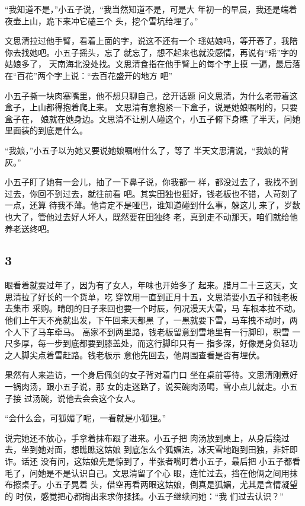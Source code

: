 “我知道不是，”小五子说，“我当然知道不是，可是大
年初一的早晨，我还是端着夜壶上山，跪下来冲它磕三个
头，挖个雪坑给埋了。”

文思清拉过他手臂，看着上面的字，说这不还有一个
瑶姑娘吗，等开春了，我陪你去找她吧。小五子摇头，忘了
就忘了，想不起来也就没感情，再说有“瑶”字的姑娘多了，
天南海北没处找。文思清食指在他手臂上的每个字上摸
一遍，最后落在“百花”两个字上说：“去百花盛开的地方
吧”

小五子撕一块肉塞嘴里，他不想只聊自己，岔开话题
问文思清，为什么老带着这盒子，上山都得抱着爬上来。
文思清有意抱紧一下盒子，说是她娘嘱咐的，只要盒子在，
娘就在她身边。文思清不让别人碰这个，小五子俯下身瞧
了半天，问她里面装的到底是什么。

“我娘，”小五子以为她又要说她娘嘱咐什么了，等了
半天文思清说，“我娘的背灰。”

小五子盯了她有一会儿，抽了一下鼻子说，你我都一
样，都没过去了，我找不到过去，你回不到过去，就往前看
吧。其实田独也挺好，钱老板也不错，人苛刻了一点，还算
待我不薄。他肯定不是哑巴，谁知道碰到什么事，躲这儿
来了，岁数也大了，管他过去好人坏人，既然要在田独终
老，真到走不动那天，咱们就给他养老送终吧。
\newline

{\centering\subsection{3}}

眼看着就要过年了，因为有了女人，年味也开始多了
起来。腊月二十三这天，文思清拉了好长的一个货单，吃
穿饮用一直到正月十五，文思清要小五子和钱老板去集市
采购。晴朗的日子来回也要一个时辰，何况漫天大雪，马
车根本拉不动。他们上午天不亮就出发，下午回来天都黑
了，一黑就要下雪，马车拽不动时，两个人下了马车牵马。
高家不到两里路，钱老板留意到雪地里有一行脚印，积雪
一尺多厚，每一步到底都要到膝盖处，而这行脚印只有一
指多深，好像是身负轻功之人脚尖点着雪赶路。钱老板示
意他先回去，他周围查看是否有埋伏。

果然有人来造访，一个身后佩剑的女子背对着门口
坐在桌前等待。文思清刚煮好一锅肉汤，跟小五子说，那
女的走迷路了，说买碗肉汤喝，雪小点儿就走。小五子接
过汤碗，说他去会会这个女人。

“会什么会，可狐媚了呢，一看就是小狐狸。”

说完她还不放心，手拿着抹布跟了进来。小五子把
肉汤放到桌上，从身后绕过去，坐到她对面，想瞧瞧这姑娘
到底怎么个狐媚法，冰天雪地跑到田独，非奸即诈。话还
没有问，这姑娘先是惊到了，半张者嘴盯着小五子，最后把
小五子都看毛了，问她是不是认识自己。文思清留了个心
眼，连忙过去，挡在他俩之间用抹布擦桌子。小五子晃着
头，借空再看两眼这姑娘，倒真是狐媚，尤其是含情凝望的
时侯，感觉把心都掏出来求你揉揉。小五子继续问她：“我
们过去认识？”

